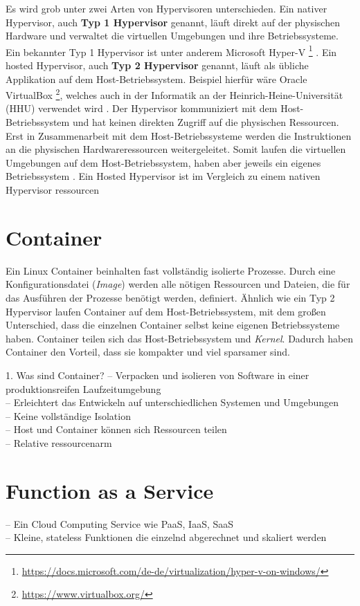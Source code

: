 Es wird grob unter zwei Arten von Hypervisoren unterschieden.
Ein nativer Hypervisor, auch \textbf{Typ 1 Hypervisor} genannt, läuft direkt auf der physischen Hardware
und verwaltet die virtuellen Umgebungen und ihre Betriebssysteme. Ein bekannter Typ 1 Hypervisor ist
unter anderem Microsoft Hyper-V
\footnote{\url{https://docs.microsoft.com/de-de/virtualization/hyper-v-on-windows/}}
\cite{RedHatHypervisor}.
Ein hosted Hypervisor, auch \textbf{Typ 2 Hypervisor}  genannt, läuft als übliche
Applikation auf dem Host-Betriebssystem. Beispiel hierfür wäre Oracle VirtualBox
\footnote{\url{https://www.virtualbox.org/}}, welches auch in der Informatik
an der Heinrich-Heine-Universität (HHU) verwendet wird \cite{HHUFachschaft}.
Der Hypervisor kommuniziert mit dem Host-Betriebssystem und hat keinen direkten Zugriff auf die
physischen Ressourcen. Erst in Zusammenarbeit mit dem Host-Betriebssysteme
werden die Instruktionen an die physischen Hardwareressourcen weitergeleitet.
Somit laufen die virtuellen Umgebungen auf dem Host-Betriebssystem,
haben aber jeweils ein eigenes Betriebssystem \cite{RedHatHypervisor}.
Ein Hosted Hypervisor ist im Vergleich zu einem nativen Hypervisor ressourcen 

\section{Container}
Ein Linux Container beinhalten fast vollständig isolierte Prozesse.
Durch eine Konfigurationsdatei (\textit{Image}) werden alle nötigen Ressourcen und Dateien,
die für das Ausführen der Prozesse benötigt werden, definiert. Ähnlich wie ein Typ 2 Hypervisor
laufen Container auf dem Host-Betriebssystem, mit dem großen Unterschied, dass die einzelnen
Container selbst keine eigenen Betriebssysteme haben. Container teilen sich das
Host-Betriebssystem und \textit{Kernel}.
Dadurch haben Container den Vorteil, dass sie kompakter und viel sparsamer sind.

1. Was sind Container?
-- Verpacken und isolieren von Software in einer produktionsreifen Laufzeitumgebung\\
-- Erleichtert das Entwickeln auf unterschiedlichen Systemen und Umgebungen\\
-- Keine vollständige Isolation\\
-- Host und Container können sich Ressourcen teilen\\
-- Relative ressourcenarm\\

\section{Function as a Service}
-- Ein Cloud Computing Service wie PaaS, IaaS, SaaS\\
-- Kleine, stateless Funktionen die einzelnd abgerechnet und skaliert werden\\


